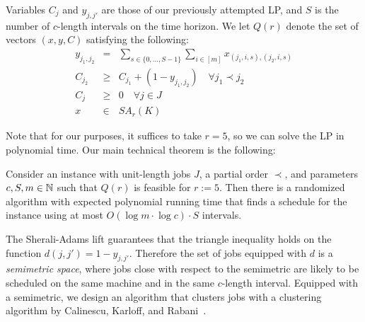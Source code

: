 Variables $C_j$ and $y_{j,j'}$ are those of our previously attempted LP, and $S$ is the number of $c$-length intervals on the time horizon.
We let $Q(r)$ denote the set of vectors $(x,y,C)$ satisfying the following:
\begin{eqnarray*}
  y_{j_1,j_2} &=& \sum_{s \in \{ 0,\ldots,S-1\}} \sum_{i \in [m]} x_{(j_1,i,s),(j_2,i,s)} \\
  C_{j_2} &\geq& C_{j_1} + (1-y_{j_1,j_2}) \quad \forall j_1 \prec j_2 \\
  C_j &\geq& 0 \quad \forall j \in J \\ 
  x &\in& SA_r(K)
\end{eqnarray*}

Note that for our purposes, it suffices to take $r=5$, so we can solve the LP in polynomial time.
Our main technical theorem is the following:
\begin{theorem}
Consider an instance with unit-length jobs $J$, a partial order $\prec$, and parameters $c,S,m \in \mathbb{N}$ such that
  $Q(r)$ is feasible for $r:=5$. Then there is a randomized algorithm with expected polynomial running time that finds a
   schedule for the instance using at most $O(\log m \cdot \log c) \cdot S$ intervals.
\end{theorem}
The Sherali-Adams lift guarantees that the triangle inequality holds on the function $d(j,j') =1-y_{j,j'}$. 
Therefore the set of jobs equipped with $d$ is a \emph{semimetric space}, where jobs close with respect to the semimetric are likely to be scheduled on the same machine
 and in the same $c$-length interval.
Equipped with a semimetric, we design an algorithm that 
clusters jobs with a clustering algorithm by Calinescu, Karloff, and Rabani~\cite{DBLP:journals/siamcomp/CalinescuKR04}.

